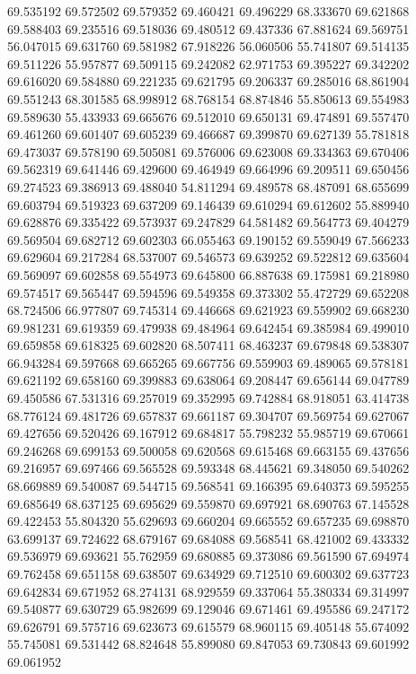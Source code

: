 69.535192
69.572502
69.579352
69.460421
69.496229
68.333670
69.621868
69.588403
69.235516
69.518036
69.480512
69.437336
67.881624
69.569751
56.047015
69.631760
69.581982
67.918226
56.060506
55.741807
69.514135
69.511226
55.957877
69.509115
69.242082
62.971753
69.395227
69.342202
69.616020
69.584880
69.221235
69.621795
69.206337
69.285016
68.861904
69.551243
68.301585
68.998912
68.768154
68.874846
55.850613
69.554983
69.589630
55.433933
69.665676
69.512010
69.650131
69.474891
69.557470
69.461260
69.601407
69.605239
69.466687
69.399870
69.627139
55.781818
69.473037
69.578190
69.505081
69.576006
69.623008
69.334363
69.670406
69.562319
69.641446
69.429600
69.464949
69.664996
69.209511
69.650456
69.274523
69.386913
69.488040
54.811294
69.489578
68.487091
68.655699
69.603794
69.519323
69.637209
69.146439
69.610294
69.612602
55.889940
69.628876
69.335422
69.573937
69.247829
64.581482
69.564773
69.404279
69.569504
69.682712
69.602303
66.055463
69.190152
69.559049
67.566233
69.629604
69.217284
68.537007
69.546573
69.639252
69.522812
69.635604
69.569097
69.602858
69.554973
69.645800
66.887638
69.175981
69.218980
69.574517
69.565447
69.594596
69.549358
69.373302
55.472729
69.652208
68.724506
66.977807
69.745314
69.446668
69.621923
69.559902
69.668230
69.981231
69.619359
69.479938
69.484964
69.642454
69.385984
69.499010
69.659858
69.618325
69.602820
68.507411
68.463237
69.679848
69.538307
66.943284
69.597668
69.665265
69.667756
69.559903
69.489065
69.578181
69.621192
69.658160
69.399883
69.638064
69.208447
69.656144
69.047789
69.450586
67.531316
69.257019
69.352995
69.742884
68.918051
63.414738
68.776124
69.481726
69.657837
69.661187
69.304707
69.569754
69.627067
69.427656
69.520426
69.167912
69.684817
55.798232
55.985719
69.670661
69.246268
69.699153
69.500058
69.620568
69.615468
69.663155
69.437656
69.216957
69.697466
69.565528
69.593348
68.445621
69.348050
69.540262
68.669889
69.540087
69.544715
69.568541
69.166395
69.640373
69.595255
69.685649
68.637125
69.695629
69.559870
69.697921
68.690763
67.145528
69.422453
55.804320
55.629693
69.660204
69.665552
69.657235
69.698870
63.699137
69.724622
68.679167
69.684088
69.568541
68.421002
69.433332
69.536979
69.693621
55.762959
69.680885
69.373086
69.561590
67.694974
69.762458
69.651158
69.638507
69.634929
69.712510
69.600302
69.637723
69.642834
69.671952
68.274131
68.929559
69.337064
55.380334
69.314997
69.540877
69.630729
65.982699
69.129046
69.671461
69.495586
69.247172
69.626791
69.575716
69.623673
69.615579
68.960115
69.405148
55.674092
55.745081
69.531442
68.824648
55.899080
69.847053
69.730843
69.601992
69.061952
